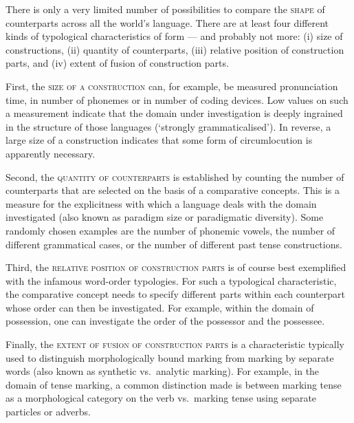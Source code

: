 %
There is only a very limited number of possibilities to compare the \textsc{shape} of counterparts across all the world's language. There are at least four different kinds of typological characteristics of form --- and probably not more: (i) size of constructions, (ii) quantity of counterparts, (iii) relative position of construction parts, and (iv) extent of fusion of construction parts.

First, the \textsc{size of a construction} can, for example, be measured pronunciation time, in number of phonemes or in number of coding devices. Low values on such a measurement indicate that the domain under investigation is deeply ingrained in the structure of those languages (`strongly grammaticalised'). In reverse, a large size of a construction indicates that some form of circumlocution is apparently necessary.

Second, the \textsc{quantity of counterparts} is established by counting the number of counterparts that are selected on the basis of a comparative concepts. This is a measure for the explicitness with which a language deals with the domain investigated (also known as paradigm size or paradigmatic diversity). Some randomly chosen examples are the number of phonemic vowels, the number of different grammatical cases, or the number of different past tense constructions. 

Third, the \textsc{relative position of construction parts} is of course best exemplified with the infamous word-order typologies. For such a typological characteristic, the comparative concept needs to specify different parts within each counterpart whose order can then be investigated. For example, within the domain of possession, one can investigate the order of the possessor and the possessee.

Finally, the \textsc{extent of fusion of construction parts} is a characteristic typically used to distinguish morphologically bound marking from marking by separate words (also known as synthetic vs.~analytic marking). For example, in the domain of tense marking, a common distinction made is between marking tense as a morphological category on the verb vs.~marking tense using separate particles or adverbs.

